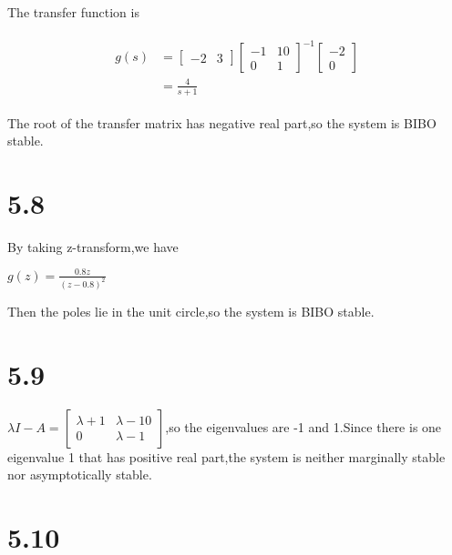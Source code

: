 \documentclass{article}
\begin{document}
The transfer function is\\
\begin{center}
    \begin{eqnarray*}\begin{split}
    g(s)&=\left[\begin{array}{ll} -2 & 3\end{array}\right]\left[\begin{array}{ll}-1 & 10\\0 & 1\end{array}\right]^{-1}\left[\begin{array}{l} -2\\0\end{array}\right]\\
    &=\frac{4}{s+1}
    \end{split}\end{eqnarray*}
\end{center}

The root of the transfer matrix has negative real part,so the system is BIBO stable.\\

\section*{5.8}

By taking z-transform,we have\\
\begin{center}
    $g(z)=\frac{0.8z}{(z-0.8)^2}$
\end{center}

Then the poles lie in the unit circle,so the system is BIBO stable.\\

\section*{5.9}

$\lambda I-A=\left[\begin{array}{ll}\lambda+1 & \lambda-10\\0 & \lambda -1\end{array}\right]$,so the eigenvalues are -1 and 1.Since there is one eigenvalue 1 that has positive real part,the system is neither marginally stable nor asymptotically stable.\\

\section*{5.10}
\end{document}
